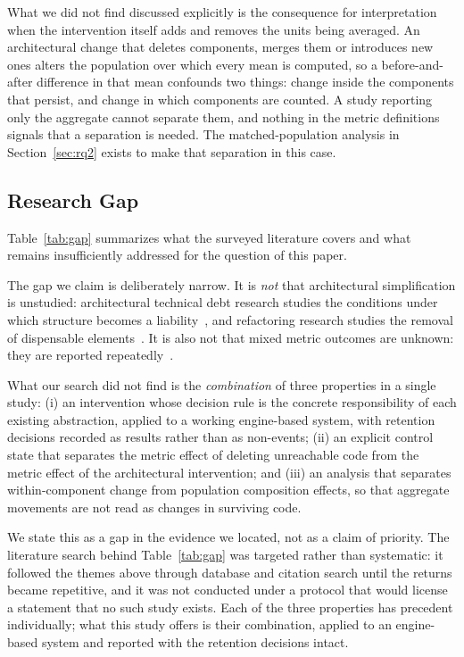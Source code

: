 \documentclass{sbc2019}%
\begin{document}
What we did not find discussed explicitly is the consequence for interpretation
when the intervention itself adds and removes the units being averaged. An
architectural change that deletes components, merges them or introduces new ones
alters the population over which every mean is computed, so a before-and-after
difference in that mean confounds two things: change inside the components that
persist, and change in which components are counted. A study reporting only the
aggregate cannot separate them, and nothing in the metric definitions signals
that a separation is needed. The matched-population analysis in
Section~\ref{sec:rq2} exists to make that separation in this case.

\subsection{Research Gap}\label{sec:gap}

Table~\ref{tab:gap} summarizes what the surveyed literature covers and what
remains insufficiently addressed for the question of this paper.

The gap we claim is deliberately narrow. It is \emph{not} that architectural
simplification is unstudied: architectural technical debt research studies the
conditions under which structure becomes a liability~\cite{verdecchia2020,verdecchia2021,li2022}, and refactoring research studies
the removal of dispensable elements~\cite{fowler2018,romano2020}. It is also
not that mixed metric outcomes are unknown: they are reported repeatedly~\cite{szoke2017,bavota2015,palomba2018}.

What our search did not find is the \emph{combination} of three properties in a
single study: (i) an intervention whose decision rule is the concrete
responsibility of each existing abstraction, applied to a working engine-based
system, with retention decisions recorded as results rather than as non-events;
(ii) an explicit control state that separates the metric effect of deleting
unreachable code from the metric effect of the architectural intervention; and
(iii) an analysis that separates within-component change from population
composition effects, so that aggregate movements are not read as changes in
surviving code.

We state this as a gap in the evidence we located, not as a claim of priority.
The literature search behind Table~\ref{tab:gap} was targeted rather than
systematic: it followed the themes above through database and citation search
until the returns became repetitive, and it was not conducted under a protocol
that would license a statement that no such study exists. Each of the three
properties has precedent individually; what this study offers is their
combination, applied to an engine-based system and reported with the retention
decisions intact.
\end{document}
